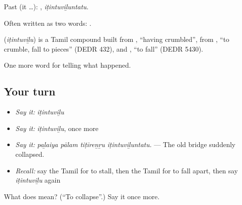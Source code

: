 Past (it …): , \emph{iṭintuviḻuntatu}.

Often written as two words:  .

\begin{cousinweb}
\textbf{} (\emph{iṭintuviḻu}) is a Tamil compound built from , \textquotedblleft{}having crumbled\textquotedblright{}, from , \textquotedblleft{}to crumble, fall to pieces\textquotedblright{} (DEDR 432), and , \textquotedblleft{}to fall\textquotedblright{} (DEDR 5430).
\end{cousinweb}

\begin{grammarlens}[title={What you've built}]
One more word for telling what happened.
\end{grammarlens}

\subsection*{Your turn}
\begin{itemize}
\raggedright
  \item \emph{Say it:} \emph{iṭintuviḻu}
  \item \emph{Say it:} \emph{iṭintuviḻu}, once more
  \item \emph{Say it:} \emph{paḻaiya pālam tiṭīreṉṟu iṭintuviḻuntatu.} — The old bridge suddenly collapsed.
  \item \emph{Recall:} say the Tamil for to stall, then the Tamil for to fall apart, then say \emph{iṭintuviḻu} again
\end{itemize}

\begin{tcolorbox}[breakable,colback=teal!4,colframe=teal!35!black,title={Before you move on}]
What does  mean? (\textquotedblleft{}To collapse\textquotedblright{}.) Say it once more.
\end{tcolorbox}
